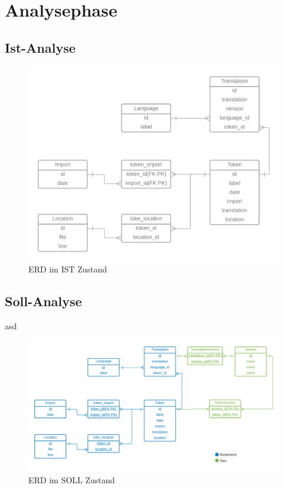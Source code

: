 \documentclass[oneside]{article}
\begin{document}
  \section{Analysephase}
  \subsection{Ist-Analyse}
  \begin{figure}[h]
    \centering
    \includegraphics[width=\textwidth]{ERD_TranslationService_IST-Analyse.png}
    \caption{ERD im IST Zustand}
  \end{figure}
  \newpage
  \subsection{Soll-Analyse}
  asd
  \begin{figure}[h]
    \centering
    \includegraphics[width=\textwidth]{ERD_TranslationService_SOLL-Analyse.png}
    \caption{ERD im SOLL Zustand}
  \end{figure}  
\end{document}
